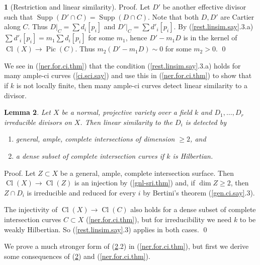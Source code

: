 \documentclass{amsart}
\newtheorem{thm}{Theorem}%
\newtheorem{lem}[thm]{Lemma}
\theoremstyle{definition}
\newtheorem{say}[thm]{}
\theoremstyle{remark}
\newcommand{\pic}[0]{\operatorname{Pic}}
\newcommand{\supp}[0]{\operatorname{Supp}}
\newcommand{\cl}[0]{\operatorname{Cl}}
\begin{document}
\begin{say}[Restriction and linear similarity]
Proof. Let $D'$ be another effective divisor such that
$\supp (D'\cap C)=\supp(D\cap C)$. Note that both $D,D'$ are Cartier along $C$.
Thus $D|_C=\sum d_i[p_i]$ and $D'|_C=\sum d'_i[p_i]$. By (\ref{rest.linsim.say}.3.a)
$\sum d'_i[p_i]=m_1\sum d_i[p_i]$ for some $m_1$, hence  $D'-m_1D$ is in the kernel of
$\cl(X)\to \pic(C)$. Thus $m_2(D'-m_1D)\sim 0$ for some $m_2>0$. \qed 
\medskip

We see in (\ref{ner.for.ci.thm}) that the condition (\ref{rest.linsim.say}.3.a) holds for many ample-ci curves (\ref{ci.sci.say})  and use this in (\ref{ner.for.ci.thm}) to show that 
 if $k$ is not locally finite, then many
ample-ci curves detect linear similarity to a divisor. 

\end{say}




\begin{lem} \label{surf.detects.lem}  
 Let $X$ be a normal, projective variety  over a field $k$ and $D_1,\dots, D_r$ irreducible divisors on $X$.  Then  linear similarity to the $D_i$ is detected by 
\begin{enumerate}
\item   general, ample, complete intersections  of dimension $\geq 2$,   and
\item   a dense subset of complete  intersection curves if  $k$ is  Hilbertian.
\end{enumerate} 
\end{lem}

Proof. Let $Z\subset X$ be a  general, ample,  complete  intersection surface.
Then $\cl(X)\to \cl(Z)$ is an injection by (\ref{gnl-sri.thm}) and, if $\dim Z\geq 2$, then 
$Z\cap D_i$ is irreducible and reduced for every $i$ by  Bertini's theorem
(\ref{gen.ci.say}.3). 



The injectivity of $\cl(X)\to \cl(C)$  also holds  for a dense subset of  complete  intersection curves $C\subset X$ (\ref{ner.for.ci.thm}), but for irreducibility we need
$k$ to be  weakly Hilbertian. So (\ref{rest.linsim.say}.3) applies in both cases. \qed


\medskip

We prove a much stronger form of (\ref{surf.detects.lem}.2)  in 
(\ref{ner.for.ci.thm}), but first we derive some consequences of  (\ref{surf.detects.lem}) and (\ref{ner.for.ci.thm}).

\end{document}
